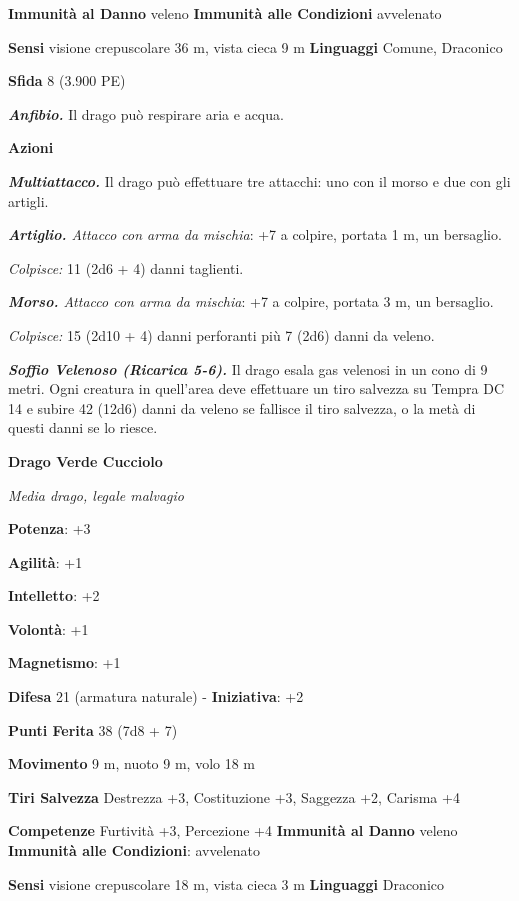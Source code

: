 \begin{multicols}{2}
\textbf{Immunità al Danno} veleno \textbf{Immunità alle Condizioni}
avvelenato

\textbf{Sensi} visione crepuscolare 36 m, vista cieca 9 m
\textbf{Linguaggi} Comune, Draconico

\textbf{Sfida} 8 (3.900 PE)\smallskip

\emph{\textbf{Anfibio.}} Il drago può respirare aria e acqua.

\smallskip\textbf{Azioni}

\emph{\textbf{Multiattacco.}} Il drago può effettuare tre attacchi: uno
con il morso e due con gli artigli.

\emph{\textbf{Artiglio.} Attacco con arma da mischia}: +7 a colpire,
portata 1 m, un bersaglio.

\emph{Colpisce:} 11 (2d6 + 4) danni taglienti.

\emph{\textbf{Morso.} Attacco con arma da mischia}: +7 a colpire,
portata 3 m, un bersaglio.

\emph{Colpisce:} 15 (2d10 + 4) danni perforanti più 7 (2d6) danni da
veleno.

\emph{\textbf{Soffio Velenoso (Ricarica 5-6).}} Il drago esala gas
velenosi in un cono di 9 metri. Ogni creatura in quell'area deve
effettuare un tiro salvezza su Tempra DC 14 e subire 42 (12d6)
danni da veleno se fallisce il tiro salvezza, o la metà di questi danni
se lo riesce.



\textbf{Drago Verde Cucciolo}

\emph{Media drago, legale malvagio}

\textbf{Potenza}: +3

\textbf{Agilità}: +1

\textbf{Intelletto}: +2

\textbf{Volontà}: +1

\textbf{Magnetismo}: +1

\textbf{Difesa} 21 (armatura naturale) - \textbf{Iniziativa}: +2

\textbf{Punti Ferita} 38 (7d8 + 7)

\textbf{Movimento} 9 m, nuoto 9 m, volo 18 m

\textbf{Tiri Salvezza} Destrezza +3, Costituzione +3, Saggezza +2,
Carisma +4

\textbf{Competenze} Furtività +3, Percezione +4 \textbf{Immunità al Danno}
veleno \textbf{Immunità alle Condizioni}: avvelenato

\textbf{Sensi} visione crepuscolare 18 m, vista cieca 3 m
\textbf{Linguaggi} Draconico


\end{multicols}
